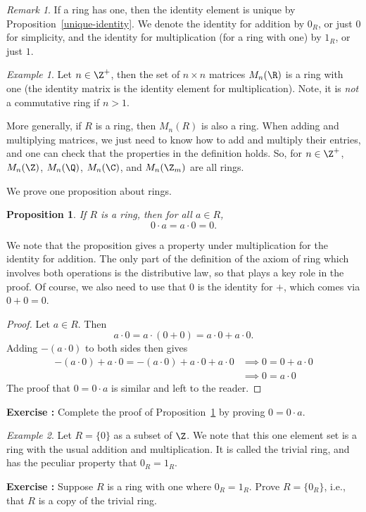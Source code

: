 \documentclass[12pt]{amsart}
\newcommand{\terminology}[1]{\textbf{\textit{#1}}}
\renewcommand{\terminology}[1]{#1}
\newcommand{\term}{\terminology}
\newcounter{probs}
\newenvironment{prob}{%
  \refstepcounter{probs}
  \par\medskip\noindent\textbf{Exercise \theprobs:} }{\par\medskip}
\theoremstyle{plain}
\newtheorem{prop}[thm]{Proposition}
\theoremstyle{definition}
\theoremstyle{remark}
\newtheorem*{remark}{Remark}
\newtheorem*{exam}{Example}
\begin{document}
\begin{remark}
  If a ring has one, then the identity element is unique by
  Proposition~\ref{unique-identity}.  We denote the identity for
  addition by $0_R$, or just $0$ for simplicity, and the identity for
  multiplication (for a ring with one) by $1_R$, or just $1$.
\end{remark}

\begin{exam}
  Let $n\in\Z^+$, then the set of $n\times n$ matrices $M_n(\R)$ is a
  ring with one (the identity matrix is the identity element for
  multiplication).  Note, it is \emph{not} a commutative ring if $n>1$.

  More generally, if $R$ is a ring, then $M_n(R)$ is also a ring.
  When adding and multiplying matrices, we just need to know how to
  add and multiply their entries, and one can check that the
  properties in the definition holds.  So, for $n\in\Z^+$, $M_n(\Z)$,
  $M_n(\Q)$,  $M_n(\C)$, and $M_n(\Z_m)$ are all rings.
\end{exam}
We prove one proposition about rings.
\begin{prop}\label{ring-zero}
  If $R$ is a ring, then for all $a\in R$,
  \[ 0\cdot a = a\cdot 0 = 0.\]
\end{prop}
We note that the proposition gives a property under multiplication for
the identity for addition.  The only part of the definition of the
axiom of ring which involves both operations is the distributive law,
so that plays a key role in the proof.  Of course, we also need to use
that $0$ is the identity for $+$, which comes via $0+0=0$.
\begin{proof}
  Let $a\in R$.  Then
  \[a\cdot 0 = a\cdot (0+0) = a\cdot 0+a\cdot 0.\]
  Adding $-(a\cdot 0)$ to both sides then gives
  \begin{align*}
-(a\cdot 0)+a\cdot 0=-(a\cdot 0)+a\cdot 0+a\cdot 0 &\implies
0 = 0+a\cdot 0\\
&\implies 0=a\cdot 0
\end{align*}
The proof that $0=0\cdot a$ is similar and left to the reader.
\end{proof}
\begin{prob}
  Complete the proof of Proposition~\ref{ring-zero} by proving
  $0=0\cdot a$.
\end{prob}

\begin{exam}
  Let $R=\{0\}$ as a subset of $\Z$.  We note that this one element
  set is a ring with the usual addition and multiplication.  It is
  called the \term{trivial ring}, and has the peculiar property that
  $0_R=1_R$.
\end{exam}
\begin{prob} \label{triv-ring-crit}
  Suppose $R$ is a ring with one where $0_R=1_R$.  Prove $R=\{0_R\}$,
  i.e., that $R$ is a copy of the trivial ring.
\end{prob}
\end{document}
